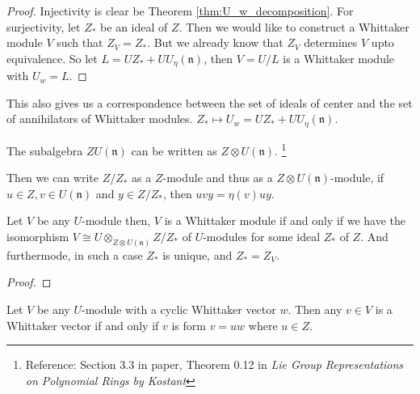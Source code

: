 \documentclass{article}
\theoremstyle{mytheoremstyle}
\theoremstyle{mytheoremstyle}
\theoremstyle{myproblemstyle}
\begin{document}
    \begin{proof}[Proof]
    	Injectivity is clear be Theorem \ref{thm:U_w_decomposition}. 
	For surjectivity, let $Z_*$ be an ideal of $Z$.
	Then we would like to construct a Whittaker module $V$ such that $Z_V = Z_*$. 
	But we already know that $Z_V$ determines $V$ upto equivalence. 
	So let $L = UZ_* + UU_\eta(\mathfrak n)$, then $V = U/L$ is a Whittaker module with $U_w = L$.
    \end{proof}

    \begin{remark}
    	This also gives us a correspondence between the set of ideals of center and the set of annihilators of Whittaker modules.
	$Z_* \mapsto U_w = UZ_* + UU_\eta(\mathfrak n)$.
    \end{remark}
    
    \begin{fact}
      The subalgebra $ZU(\mathfrak n)$ can be written as $Z \otimes U(\mathfrak n)$. 
      \footnote{Reference: Section 3.3 in paper, Theorem 0.12 in \emph{Lie Group Representations on Polynomial Rings by Kostant}}

      Then we can write $Z/Z_*$ as a $Z$-module and thus as a $Z\otimes U(\mathfrak n)$-module, if $u \in Z, v \in U(\mathfrak n)$ 
      and $y \in Z/Z_*$, then $uvy = \eta(v)uy$.
    \end{fact}

    \begin{theorem}
      Let $V$ be any $U$-module then, $V$ is a Whittaker module if and only if we have the isomorphism 
      $V \cong U \otimes_{Z \otimes U(\mathfrak n)} Z/Z_*$ of $U$-modules for some ideal $Z_*$ of $Z$.
      And furthermode, in such a case $Z_*$ is unique, and $Z_* = Z_V$.
    \end{theorem}
    
    \begin{proof}[Proof]
    \end{proof}


    \begin{theorem}
      Let $V$ be any $U$-module with a cyclic Whittaker vector $w$. Then any $v \in V$ is a Whittaker vector if and only if 
      $v$ is form $v = uw$ where $u \in Z$.
    \end{theorem}
\end{document}
